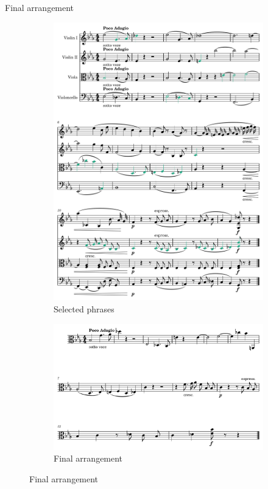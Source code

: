 \documentclass{beamer}
\begin{document}
\begin{frame}{Final arrangement}
    \begin{figure}
        \begin{subfigure}{0.5\linewidth}
            \includegraphics[width=.95\linewidth]{../Figures/selected-1.png}
            \caption{Selected phrases}
        \end{subfigure}\hfill
        \begin{subfigure}{0.5\linewidth}
            \includegraphics[width=.95\linewidth]{../Figures/arrangement-1.png}
            \caption{Final arrangement}
        \end{subfigure}
    \end{figure}


\end{frame}
\end{document}
